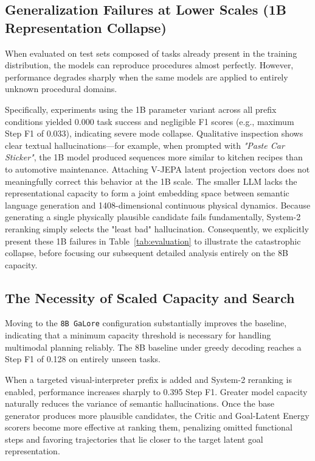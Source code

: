 \documentclass{article}
\begin{document}
\subsection{Generalization Failures at Lower Scales (1B Representation Collapse)}
When evaluated on test sets composed of tasks already present in the training distribution, the models can reproduce procedures almost perfectly. However, performance degrades sharply when the same models are applied to entirely unknown procedural domains. 

Specifically, experiments using the 1B parameter variant across all prefix conditions yielded 0.000 task success and negligible F1 scores (e.g., maximum Step F1 of 0.033), indicating severe mode collapse. Qualitative inspection shows clear textual hallucinations---for example, when prompted with \textit{"Paste Car Sticker"}, the 1B model produced sequences more similar to kitchen recipes than to automotive maintenance. Attaching V-JEPA latent projection vectors does not meaningfully correct this behavior at the 1B scale. The smaller LLM lacks the representational capacity to form a joint embedding space between semantic language generation and 1408-dimensional continuous physical dynamics. Because generating a single physically plausible candidate fails fundamentally, System-2 reranking simply selects the "least bad" hallucination. Consequently, we explicitly present these 1B failures in Table~\ref{tab:evaluation} to illustrate the catastrophic collapse, before focusing our subsequent detailed analysis entirely on the 8B capacity.

\subsection{The Necessity of Scaled Capacity and Search}
Moving to the \texttt{8B GaLore} configuration substantially improves the baseline, indicating that a minimum capacity threshold is necessary for handling multimodal planning reliably. The 8B baseline under greedy decoding reaches a Step F1 of 0.128 on entirely unseen tasks.

When a targeted visual-interpreter prefix is added and System-2 reranking is enabled, performance increases sharply to 0.395 Step F1. Greater model capacity naturally reduces the variance of semantic hallucinations. Once the base generator produces more plausible candidates, the Critic and Goal-Latent Energy scorers become more effective at ranking them, penalizing omitted functional steps and favoring trajectories that lie closer to the target latent goal representation.
\end{document}
